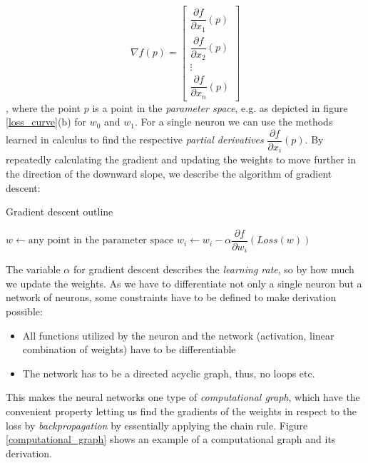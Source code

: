 $$
    \nabla f(p)=\left[\begin{array}{c}
            \dfrac{\partial f}{\partial x_1}(p) \\
            \dfrac{\partial f}{\partial x_2}(p) \\
            \vdots                              \\
            \dfrac{\partial f}{\partial x_n}(p)
        \end{array}\right]
$$,
where the point $p $ is a point in the \textit{parameter space}, e.g. as depicted in figure \ref{loss_curve}(b) for $w_0 $ and $ w_1 $. For a single neuron we can use the methods learned in calculus to find the respective \textit{partial derivatives} $  \dfrac{\partial f}{\partial x_i}(p) $. By repeatedly calculating the gradient and updating the weights to move further in the direction of the downward slope, we describe the algorithm of gradient descent:

\begin{algorithm}
    \caption{Gradient descent outline \cite[p. 1253]{russell_artificial_2021}}\label{alg:gradient_descent}
    \begin{algorithmic}
        \State $w \gets \text{any point in the parameter space}$
        \State $w_i \gets w_i - \alpha \dfrac{\partial f}{\partial w_i}(Loss(w))$
        \EndFor
        \EndWhile
    \end{algorithmic}
\end{algorithm}

The variable $ \alpha $ for gradient descent describes the \textit{learning rate}, so by how much we update the weights. As we have to differentiate not only a single neuron but a network of neurons, some constraints have to be defined to make derivation possible:

\begin{itemize}
    \item All functions utilized by the neuron and the network (activation, linear combination of weights) have to be differentiable
    \item The network has to be a directed acyclic graph, thus, no loops etc.
\end{itemize}

This makes the neural networks one type of \textit{computational graph}, which have the convenient property letting us find the gradients of the weights in respect to the loss by \textit{backpropagation} by essentially applying the chain rule. Figure \ref{computational_graph} shows an example of a computational graph and its derivation.

